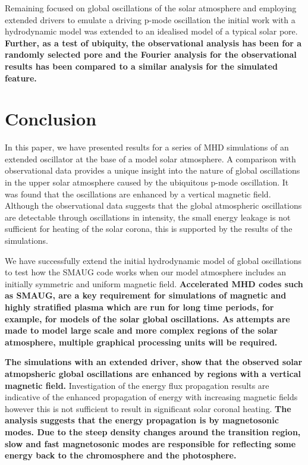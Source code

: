 \documentclass[physics,article,submit,pdftex,moreauthors]{Definitions/mdpi}
\begin{document}
Remaining focused on global oscillations of the solar atmosphere and employing extended drivers to emulate a driving p-mode oscillation the initial work with a hydrodynamic model was extended to an idealised model of a typical solar pore. {\bf Further, as a test of ubiquity, the observational analysis has been for a randomly selected pore and the Fourier analysis for the observational results has been compared to a similar analysis for the simulated feature.}  








\section{Conclusion}

In this paper, we have presented results for a series of MHD simulations of an extended oscillator at the base of a model solar atmosphere. A comparison with observational data provides a unique insight into the nature of  global oscillations in the upper solar atmosphere caused by the ubiquitous p-mode oscillation. It was found that the oscillations are enhanced by a vertical magnetic field. Although the observational data suggests that the global atmospheric oscillations are detectable through oscillations in intensity, the small energy leakage is not sufficient for heating of the solar corona, this is supported by the results of the simulations.

We  have successfully extend the initial hydrodynamic model of global oscillations to test how the SMAUG \cite{Griffiths2015} code works when our model atmosphere includes an initially symmetric and uniform magnetic field. {\bf Accelerated MHD codes such as SMAUG, are a key requirement for simulations of magnetic and highly stratified plasma which are run for long time periods, for example, for models of the solar global oscillations. As attempts are made to model large scale and more complex regions of the solar atmosphere, multiple graphical processing units will be required.}

{\bf The simulations with an extended driver, show that the observed  solar atmopsheric global oscillations are enhanced by regions with a vertical magnetic field. } Investigation of the energy flux propagation results are indicative of the enhanced propagation of energy with increasing magnetic fields however this is not sufficient to result in significant solar coronal heating. {\bf The analysis suggests that the energy propagation is by magnetosonic modes. Due to the steep density changes around the transition region, slow and fast magnetosonic modes are responsible for reflecting some energy back to the chromosphere and the photosphere. }  
\end{document}
